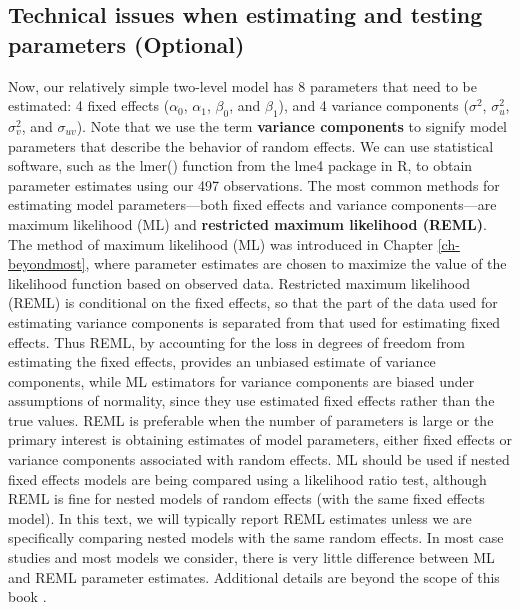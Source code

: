 \documentclass[
]{krantz}
\begin{document}
\hypertarget{multileveltechnical}{%
\subsection{Technical issues when estimating and testing parameters (Optional)}\label{multileveltechnical}}

Now, our relatively simple two-level model has 8 parameters that need to be estimated: 4 fixed effects (\(\alpha_{0}\), \(\alpha_{1}\), \(\beta_{0}\), and \(\beta_{1}\)), and 4 variance components (\(\sigma^{2}\), \(\sigma_{u}^{2}\), \(\sigma_{v}^{2}\), and \(\sigma_{uv}\)). Note that we use the term \textbf{variance components}  to signify model parameters that describe the behavior of random effects. We can use statistical software, such as the lmer() function from the lme4 package in R, to obtain parameter estimates using our 497 observations. The most common methods for estimating model parameters---both fixed effects and variance components---are maximum likelihood (ML) and \textbf{restricted maximum likelihood (REML)}.  The method of maximum likelihood (ML) was introduced in Chapter \ref{ch-beyondmost}, where parameter estimates are chosen to maximize the value of the likelihood function based on observed data. Restricted maximum likelihood (REML) is conditional on the fixed effects, so that the part of the data used for estimating variance components is separated from that used for estimating fixed effects. Thus REML, by accounting for the loss in degrees of freedom from estimating the fixed effects, provides an unbiased estimate of variance components, while ML estimators for variance components are biased under assumptions of normality, since they use estimated fixed effects rather than the true values. REML is preferable when the number of parameters is large or the primary interest is obtaining estimates of model parameters, either fixed effects or variance components associated with random effects. ML should be used if nested fixed effects models are being compared using a likelihood ratio test, although REML is fine for nested models of random effects (with the same fixed effects model). In this text, we will typically report REML estimates unless we are specifically comparing nested models with the same random effects. In most case studies and most models we consider, there is very little difference between ML and REML parameter estimates. Additional details are beyond the scope of this book \citep{Singer2003}.
\end{document}
